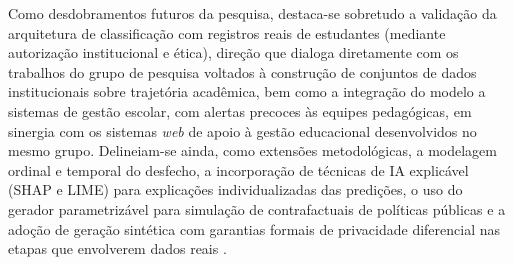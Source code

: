 Como desdobramentos futuros da pesquisa, destaca-se sobretudo a validação da arquitetura de classificação com registros reais de estudantes (mediante autorização institucional e ética), direção que dialoga diretamente com os trabalhos do grupo de pesquisa voltados à construção de conjuntos de dados institucionais sobre trajetória acadêmica, bem como a integração do modelo a sistemas de gestão escolar, com alertas precoces às equipes pedagógicas, em sinergia com os sistemas \textit{web} de apoio à gestão educacional desenvolvidos no mesmo grupo. Delineiam-se ainda, como extensões metodológicas, a modelagem ordinal e temporal do desfecho, a incorporação de técnicas de IA explicável (SHAP e LIME) para explicações individualizadas das predições, o uso do gerador parametrizável para simulação de contrafactuais de políticas públicas e a adoção de geração sintética com garantias formais de privacidade diferencial nas etapas que envolverem dados reais \cite{kostopoulos2026}.
